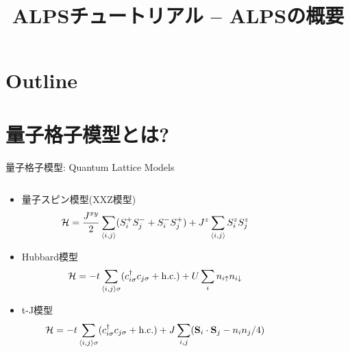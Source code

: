 \title{ALPSチュートリアル -- ALPSの概要}



\begin{frame}
  \titlepage
\end{frame}

\section*{Outline}
\begin{frame}
  \tableofcontents
\end{frame}

\section{量子格子模型とは?}
\begin{frame}{量子格子模型: Quantum Lattice Models}
  \begin{columns}[T]
    \begin{column}{.8\textwidth}
      \begin{itemize}
      \item 量子スピン模型(XXZ模型) \begin{equation*} {\cal H} = \frac{J^{xy}}{2}
        \sum_{\langle i,j \rangle} (S^+_i S^-_j + S^-_i S^+_j) + J^z
        \sum_{\langle i,j \rangle} S^z_i S^z_j \end{equation*}
      \item Hubbard模型 \begin{equation*} {\cal H} = -t \sum_{\langle i,j \rangle \sigma}
        (c^\dagger_{i\sigma} c_{j\sigma} + \mbox{h.c.}) + U \sum_{i}
        n_{i\uparrow} n_{i\downarrow} \end{equation*}
      \item t-J模型 \begin{equation*} {\cal H} = -t \sum_{\langle i,j \rangle \sigma}
        (c^\dagger_{i\sigma} c_{j\sigma} + \mbox{h.c.}) + J \sum_{i,j}
        ({\bf S}_i \cdot {\bf S}_j - n_{i} n_{j} / 4) \end{equation*}
      \end{itemize}
    \end{column}
    \begin{column}{.2\textwidth}

\end{column}
\end{columns}
\end{frame}
